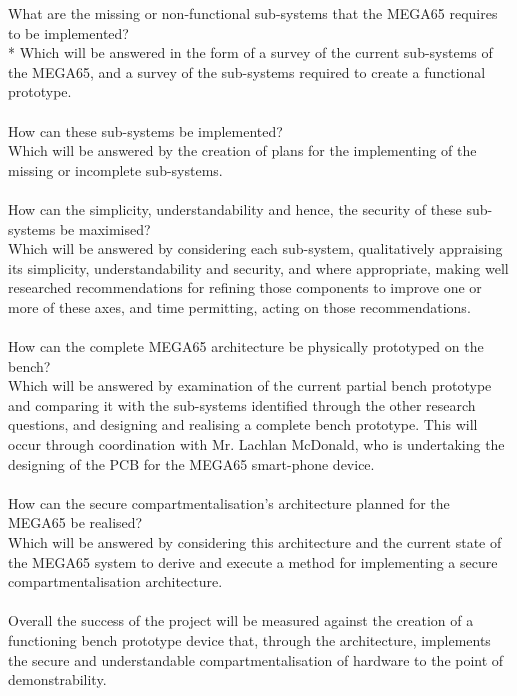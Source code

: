 What are the missing or non-functional sub-systems that the MEGA65 requires to be implemented?\\*
Which will be answered in the form of a survey of the current sub-systems of the MEGA65, and a survey of the sub-systems required to create a functional prototype.\\
\\
How can these sub-systems be implemented?\\
Which will be answered by the creation of plans for the implementing of the missing or incomplete sub-systems.\\
\\
How can the simplicity, understandability and hence, the security of these sub-systems be maximised?\\
Which will be answered by considering each sub-system, qualitatively appraising its simplicity, understandability and security, and where appropriate, making well researched recommendations for refining those components to improve one or more of these axes, and time permitting, acting on those recommendations.\\
\\
How can the complete MEGA65 architecture be physically prototyped on the bench?\\
Which will be answered by examination of the current partial bench prototype and comparing it with the sub-systems identified through the other research questions, and designing and realising a complete bench prototype.
This will occur through coordination with Mr. Lachlan McDonald, who is undertaking the designing of the PCB for the MEGA65 smart-phone device.\\
\\
How can the secure compartmentalisation's architecture planned for the MEGA65 be realised?\\
Which will be answered by considering this architecture and the current state of the MEGA65 system to derive and execute a method for implementing a secure compartmentalisation architecture.\\
\\
Overall the success of the project will be measured against the creation of a functioning bench prototype device that, through the architecture, implements the secure and understandable compartmentalisation of hardware to the point of demonstrability.



